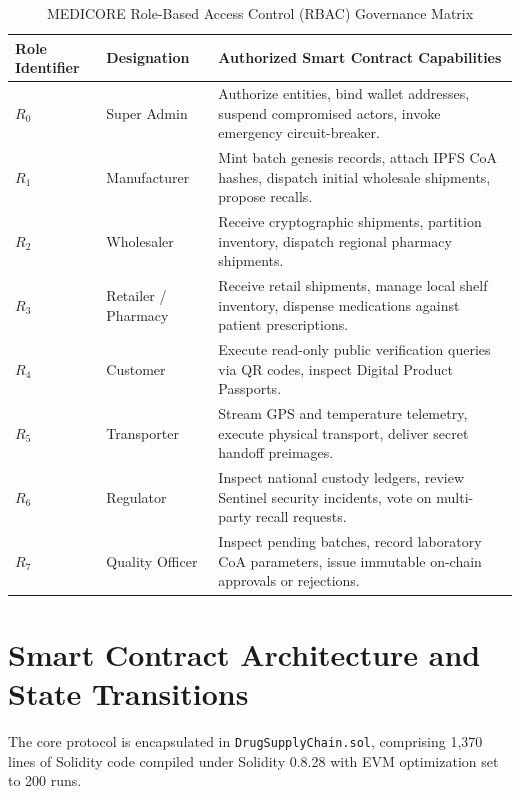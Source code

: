 \documentclass[pdflatex,sn-mathphys-num]{sn-jnl}
\theoremstyle{thmstyleone}
\theoremstyle{thmstyletwo}
\theoremstyle{thmstylethree}
\begin{document}
\begin{table}[htbp]
\centering
\caption{MEDICORE Role-Based Access Control (RBAC) Governance Matrix}
\label{tab:roles}
\vspace{0.5em}
\begin{tabularx}{\textwidth}{llX}
\toprule
\textbf{Role Identifier} & \textbf{Designation} & \textbf{Authorized Smart Contract Capabilities} \\
\midrule
$R_0$ & Super Admin & Authorize entities, bind wallet addresses, suspend compromised actors, invoke emergency circuit-breaker. \\
$R_1$ & Manufacturer & Mint batch genesis records, attach IPFS CoA hashes, dispatch initial wholesale shipments, propose recalls. \\
$R_2$ & Wholesaler & Receive cryptographic shipments, partition inventory, dispatch regional pharmacy shipments. \\
$R_3$ & Retailer / Pharmacy & Receive retail shipments, manage local shelf inventory, dispense medications against patient prescriptions. \\
$R_4$ & Customer & Execute read-only public verification queries via QR codes, inspect Digital Product Passports. \\
$R_5$ & Transporter & Stream GPS and temperature telemetry, execute physical transport, deliver secret handoff preimages. \\
$R_6$ & Regulator & Inspect national custody ledgers, review Sentinel security incidents, vote on multi-party recall requests. \\
$R_7$ & Quality Officer & Inspect pending batches, record laboratory CoA parameters, issue immutable on-chain approvals or rejections. \\
\bottomrule
\end{tabularx}
\end{table}


\section{Smart Contract Architecture and State Transitions}\label{sec:smart-contracts}

The core protocol is encapsulated in \texttt{DrugSupplyChain.sol}, comprising 1,370 lines of Solidity code compiled under Solidity 0.8.28 with EVM optimization set to 200 runs.
\end{document}
